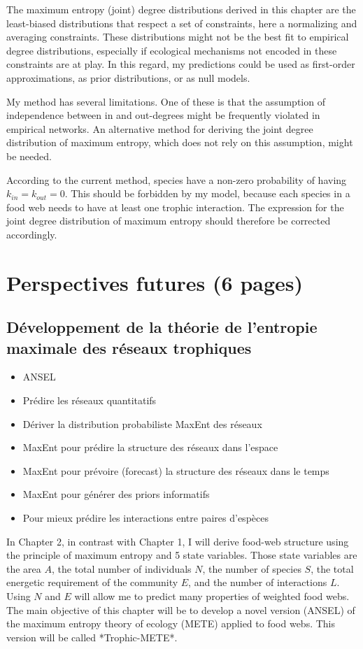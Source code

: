 The maximum entropy (joint) degree distributions derived in this chapter are the
least-biased distributions that respect a set of constraints, here a normalizing
and averaging constraints. These distributions might not be the best fit to
empirical degree distributions, especially if ecological mechanisms not encoded
in these constraints are at play. In this regard, my predictions could be used
as first-order approximations, as prior distributions, or as null models.

My method has several limitations. One of these is that the assumption of
independence between in and out-degrees might be frequently violated in
empirical networks. An alternative method for deriving the joint degree
distribution of maximum entropy, which does not rely on this assumption, might
be needed. 

According to the current
method, species have a non-zero probability of having $k_{in} = k_{out} = 0$.
This should be forbidden by my model, because each species in a food web needs
to have at least one trophic interaction. The expression for the joint degree
distribution of maximum entropy should therefore be corrected accordingly.

\section{Perspectives futures (6 pages)}

\subsection{Développement de la théorie de l'entropie maximale des réseaux trophiques} 

\begin{itemize}
    \item ANSEL 
    \item Prédire les réseaux quantitatifs
    \item Dériver la distribution probabiliste MaxEnt des réseaux
    \item MaxEnt pour prédire la structure des réseaux dans l'espace
    \item MaxEnt pour prévoire (forecast) la structure des réseaux dans le temps
    \item MaxEnt pour générer des priors informatifs 
    \item Pour mieux prédire les interactions entre paires d'espèces
\end{itemize}

In Chapter 2, in contrast with Chapter 1, I will derive food-web structure using
the principle of maximum entropy and 5 state variables. Those state variables
are the area $A$, the total number of individuals $N$, the number of species
$S$, the total energetic requirement of the community $E$, and the number of
interactions $L$. Using $N$ and $E$ will allow me to predict many properties of
weighted food webs. The main objective of this chapter will be to develop a
novel version (ANSEL) of the maximum entropy theory of ecology (METE) applied to
food webs. This version will be called *Trophic-METE*.

